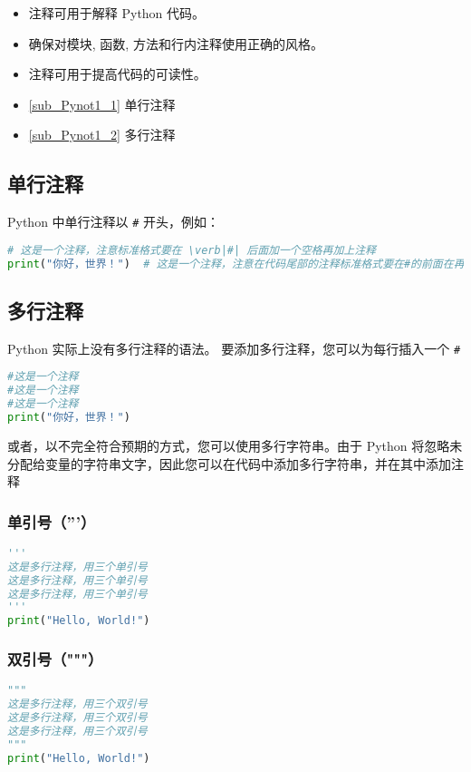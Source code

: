 
\begin{itemize}
\item 注释可用于解释 Python 代码。
\item 确保对模块, 函数, 方法和行内注释使用正确的风格。
\item 注释可用于提高代码的可读性。
\end{itemize}

\begin{itemize}
\item \autoref{sub_Pynot1_1} 单行注释
\item \autoref{sub_Pynot1_2} 多行注释
\end{itemize}

\subsection{单行注释}\label{sub_Pynot1_1}
Python 中单行注释以 \verb|#| 开头，例如：
\begin{lstlisting}[language=python]
# 这是一个注释，注意标准格式要在 \verb|#| 后面加一个空格再加上注释
print("你好，世界！")  # 这是一个注释，注意在代码尾部的注释标准格式要在#的前面在再加两个空格
\end{lstlisting}

\subsection{多行注释}
\label{sub_Pynot1_2}
Python 实际上没有多行注释的语法。
要添加多行注释，您可以为每行插入一个 \verb|#|
\begin{lstlisting}[language=python]
#这是一个注释
#这是一个注释
#这是一个注释
print("你好，世界！")
\end{lstlisting}

或者，以不完全符合预期的方式，您可以使用多行字符串。由于 Python 将忽略未分配给变量的字符串文字，因此您可以在代码中添加多行字符串，并在其中添加注释
\subsubsection{单引号（'''）}
\begin{lstlisting}[language=python]
'''
这是多行注释，用三个单引号
这是多行注释，用三个单引号 
这是多行注释，用三个单引号
'''
print("Hello, World!")
\end{lstlisting}

\subsubsection{双引号（"""）}
\begin{lstlisting}[language=python]
"""
这是多行注释，用三个双引号
这是多行注释，用三个双引号 
这是多行注释，用三个双引号
"""
print("Hello, World!")
\end{lstlisting}
